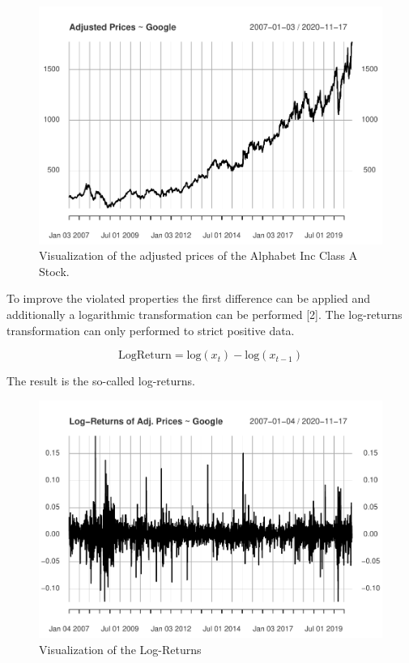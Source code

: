 \documentclass[
]{article}
\begin{document}
\begin{figure}

{\centering \includegraphics[width=0.7\linewidth]{00_main_files/figure-latex/chap2.1-1} 

}

\caption{Visualization of the adjusted prices of the Alphabet Inc Class A Stock.}\label{fig:chap2.1}
\end{figure}
\newpage

To improve the violated properties the first difference can be applied
and additionally a logarithmic transformation can be performed {[}2{]}.
The log-returns transformation can only performed to strict positive
data.

\[\mathrm{LogReturn} = \mathrm{log}(x_{t})-\mathrm{log}(x_{t-1})\]

The result is the so-called log-returns.

\begin{figure}

{\centering \includegraphics[width=0.7\linewidth]{00_main_files/figure-latex/chap2.2-1} 

}

\caption{Visualization of the Log-Returns}\label{fig:chap2.2}
\end{figure}
\end{document}
